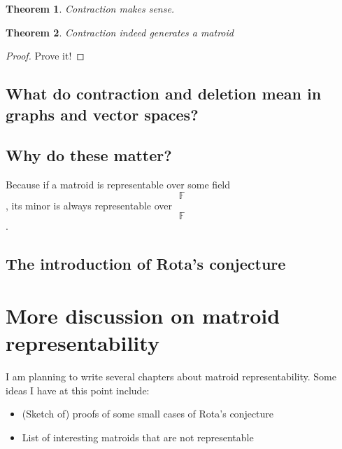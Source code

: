 \documentclass[psamsfonts]{amsart}
\newtheorem{thm}{Theorem}[section]
\theoremstyle{definition}
\theoremstyle{remark}
\numberwithin{equation}{section}
\begin{document}
\begin{thm}
Contraction makes sense.
\end{thm}

\begin{thm}
Contraction indeed generates a matroid
\end{thm}

\begin{proof}
Prove it!
\end{proof}

\subsection{What do contraction and deletion mean in graphs and vector spaces?}

\subsection{Why do these matter?}
Because if a matroid is representable over some field $$\mathbb{F}$$, its minor is always representable over $$\mathbb{F}$$.

\subsection{The introduction of Rota's conjecture}

\section{More discussion on matroid representability}
I am planning to write several chapters about matroid representability.
Some ideas I have at this point include:

\begin{itemize}
\item (Sketch of) proofs of some small cases of Rota's conjecture
\item List of interesting matroids that are not representable
\end{itemize}
\end{document}

